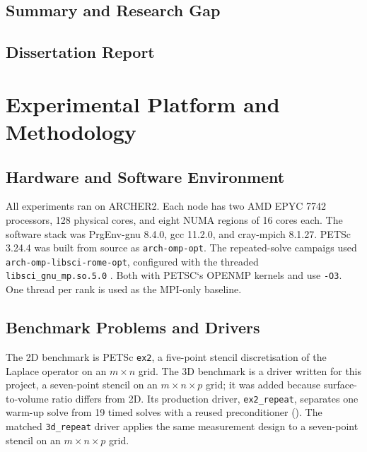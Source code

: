 \documentclass[12pt,a4paper,notitlepage]{report}
\begin{document}
\section{Summary and Research Gap}
\label{sec:gap}

\section{Dissertation Report}


\chapter{Experimental Platform and Methodology}
\label{ch:methodology}


\section{Hardware and Software Environment}
\label{sec:env}
All experiments ran on ARCHER2. Each node has two AMD EPYC 7742 processors, 128 physical
cores, and eight NUMA regions of 16 cores each. The software stack was PrgEnv-gnu 8.4.0,
gcc 11.2.0, and cray-mpich 8.1.27. PETSc 3.24.4 was built from source as
\texttt{arch-omp-opt}. The repeated-solve campaigs used
\texttt{arch-omp-libsci-rome-opt}, configured with the threaded \texttt{libsci\_gnu\_mp.so.5.0} .
Both with PETSC`s OPENMP kernels and use \texttt{-O3}.
One thread per rank is used as the MPI-only baseline. 





\section{Benchmark Problems and Drivers}
\label{sec:benchmarks}
The 2D benchmark is PETSc \texttt{ex2}, a five-point stencil discretisation of the Laplace
operator on an $m \times n$ grid. The 3D benchmark is a driver written for this project, a
seven-point stencil on an $m \times n \times p$ grid; it was added because
surface-to-volume ratio differs from 2D. Its production driver,
\texttt{ex2\_repeat}, separates one warm-up solve from 19 timed solves with a reused
preconditioner (). The matched \texttt{3d\_repeat} driver applies the
same measurement design to a seven-point stencil on an $m \times n \times p$ grid.
\end{document}
